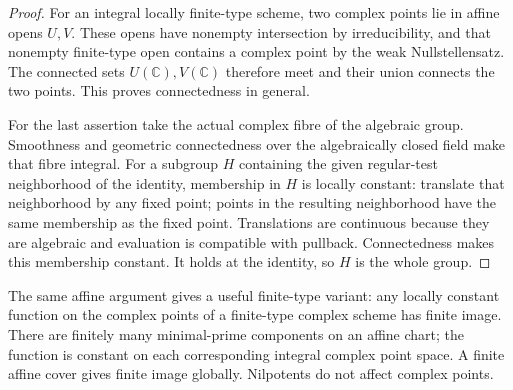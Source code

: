 \begin{proof}
For an integral locally finite-type scheme, two complex
points lie in affine opens \(U,V\).
These opens have nonempty intersection by irreducibility,
and that nonempty finite-type open contains a complex
point by the weak Nullstellensatz.
The connected sets \(U(\mathbb C),V(\mathbb C)\) therefore
meet and their union connects the two points.
This proves connectedness in general.

For the last assertion take the actual complex fibre of
the algebraic group.
Smoothness and geometric connectedness over the
algebraically closed field make that fibre integral.
For a subgroup \(H\) containing the given regular-test
neighborhood of the identity, membership in \(H\) is
locally constant: translate that neighborhood by any
fixed point; points in the resulting neighborhood have
the same membership as the fixed point.
Translations are continuous because they are algebraic
and evaluation is compatible with pullback.
Connectedness makes this membership constant.
It holds at the identity, so \(H\) is the whole group.
\end{proof}

The same affine argument gives a useful finite-type variant:
any locally constant function on the complex points of
a finite-type complex scheme has finite image.
There are finitely many minimal-prime components on an
affine chart; the function is constant on each corresponding
integral complex point space.
A finite affine cover gives finite image globally.
Nilpotents do not affect complex points.

